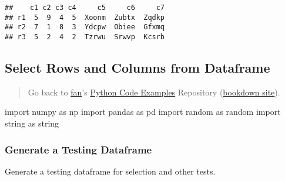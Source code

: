 \documentclass[
]{book}
\newenvironment{Shaded}{\begin{snugshade}}{\end{snugshade}}
\newcommand{\ImportTok}[1]{#1}
\newcommand{\NormalTok}[1]{#1}
\begin{document}
\begin{verbatim}
##    c1 c2 c3 c4     c5     c6     c7
## r1  5  9  4  5  Xoonm  Zubtx  Zqdkp
## r2  7  1  8  3  Ydcpw  Obiee  Gfxmq
## r3  5  2  4  2  Tzrwu  Srwvp  Kcsrb
\end{verbatim}

\hypertarget{select-rows-and-columns-from-dataframe}{%
\subsection{Select Rows and Columns from Dataframe}\label{select-rows-and-columns-from-dataframe}}

\begin{quote}
Go back to \href{http://fanwangecon.github.io/}{fan}'s \href{https://fanwangecon.github.io/pyfan/}{Python Code Examples} Repository (\href{https://fanwangecon.github.io/pyfan/bookdown}{bookdown site}).
\end{quote}

\begin{Shaded}
\begin{Highlighting}[]
\ImportTok{import}\NormalTok{ numpy }\ImportTok{as}\NormalTok{ np}
\ImportTok{import}\NormalTok{ pandas }\ImportTok{as}\NormalTok{ pd}
\ImportTok{import}\NormalTok{ random }\ImportTok{as}\NormalTok{ random}
\ImportTok{import}\NormalTok{ string }\ImportTok{as}\NormalTok{ string}
\end{Highlighting}
\end{Shaded}

\hypertarget{generate-a-testing-dataframe}{%
\subsubsection{Generate a Testing Dataframe}\label{generate-a-testing-dataframe}}

Generate a testing dataframe for selection and other tests.
\end{document}
